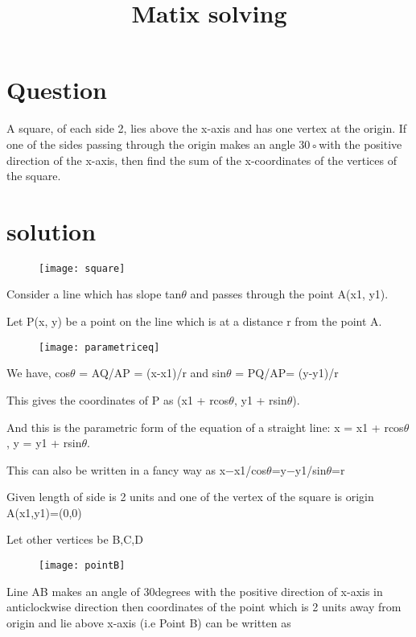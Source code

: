 \documentclass[12]{article}
\begin{document}
\title{Matix solving}
\maketitle
\section{Question}
A square, of each side 2, lies above the x-axis
and has one vertex at the origin. If one of the
sides passing through the origin makes an angle
30◦with the positive direction of the x-axis,
then find the sum of the x-coordinates of the
vertices of the square.
\section{solution}

\begin{figure}[h]
\centering
\texttt{[image: square]}
\end{figure}


Consider a line which has slope tan$\theta$ and passes through the point A(x1, y1).

Let P(x, y) be a point on the line which is at a distance r from the point A.

\begin{figure}[h]
\centering
\texttt{[image: parametriceq]}
\end{figure}

We have, cos$\theta$ = AQ/AP = (x-x1)/r and sin$\theta$ = PQ/AP= (y-y1)/r

This gives the coordinates of P as (x1 + rcos$\theta$, y1 + rsin$\theta$).

And this is the parametric form of the equation of a straight line:  x = x1 + rcos$\theta$,  y = y1 + rsin$\theta$. 

This can also be written in a fancy way as x−x1/cos$\theta$=y−y1/sin$\theta$=r

Given length of side is 2 units and one of the vertex of the square is origin A(x1,y1)=(0,0)

Let other vertices be B,C,D

\begin{figure}[h]
\centering
\texttt{[image: pointB]}
\end{figure}

Line AB makes an angle of 30degrees with the positive direction of x-axis in anticlockwise direction
then coordinates of the point which is 2 units away from origin and lie above x-axis (i.e Point B) can be written as
\end{document}
